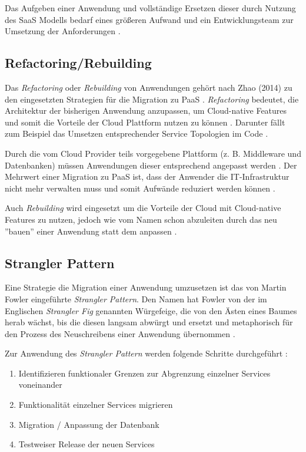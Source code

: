 Das Aufgeben einer Anwendung und vollständige Ersetzen dieser durch Nutzung des \ac{SaaS} Modells bedarf eines größeren Aufwand und ein Entwicklungsteam zur Umsetzung der Anforderungen \cite[Vgl.][]{CIO}. \pagebreak

\subsection{Refactoring/Rebuilding}
Das \textit{Refactoring} oder \textit{Rebuilding} von Anwendungen gehört nach Zhao (2014) zu den eingesetzten Strategien für die Migration zu \ac{PaaS} \cite[Vgl.][S. 144]{Zhao2014}. \textit{Refactoring} bedeutet, die Architektur der bisherigen Anwendung anzupassen, um Cloud-native Features \cite[Vgl.][S. 2]{Ahmad2018} und somit die Vorteile der Cloud Plattform nutzen zu können \cite[Vgl.][]{CIO}. Darunter fällt zum Beispiel das Umsetzen entsprechender Service Topologien im Code \cite[Vgl.][S. 2]{Holmes2018}.

Durch die vom Cloud Provider teils vorgegebene Plattform (z. B. Middleware und Datenbanken) müssen Anwendungen dieser entsprechend angepasst werden \cite[Vgl.][S. 227]{Surianarayanan2019}. Der Mehrwert einer Migration zu \ac{PaaS} ist, dass der Anwender die IT-Infrastruktur nicht mehr verwalten muss und somit Aufwände reduziert werden können \cite[Vgl.][S. 6]{Pahl}.

Auch \textit{Rebuilding} wird eingesetzt um die Vorteile der Cloud mit Cloud-native Features zu nutzen, jedoch wie vom Namen schon abzuleiten durch das neu ''bauen'' einer Anwendung statt dem anpassen \cite[Vgl.][S. 2]{Ahmad2018}.

\subsection{Strangler Pattern}
Eine Strategie die Migration einer Anwendung umzusetzen ist das von Martin Fowler eingeführte \textit{Strangler Pattern}. Den Namen hat Fowler von der im Englischen \textit{Strangler Fig} genannten Würgefeige, die von den Ästen eines Baumes herab wächst, bis die diesen langsam abwürgt und ersetzt und metaphorisch für den Prozess des Neuschreibens einer Anwendung übernommen \cite[Vgl.][]{Fowler2004}\cite[Vgl.][]{Ibryam2021}.

Zur Anwendung des \textit{Strangler Pattern} werden folgende Schritte durchgeführt \cite[Vgl. auch im Folgenden][]{Ibryam2021}:

\begin{enumerate}
    \item Identifizieren funktionaler Grenzen zur Abgrenzung einzelner Services voneinander
    \item Funktionalität einzelner Services migrieren
    \item Migration / Anpassung der Datenbank
    \item Testweiser Release der neuen Services
\end{enumerate}

